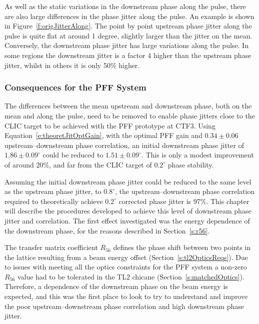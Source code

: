 As well as the static variations in the downstream phase along the pulse, there are also large differences in the phase jitter along the pulse. An example is shown in Figure~\ref{f:origJitterAlong}. The point by point upstream phase jitter along the pulse is quite flat at around 1 degree, slightly larger than the jitter on the mean. Conversely, the downstream phase jitter has large variations along the pulse. In some regions the downstream jitter is a factor 4 higher than the upstream phase jitter, whilst in others it is only 50\% higher.

\subsubsection{Consequences for the PFF System}

The differences between the mean upstream and downstream phase, both on the mean and along the pulse, need to be removed to enable phase jitters close to the CLIC target to be achieved with the PFF prototype at CTF3. Using Equation~\ref{e:theoretJitOptGain}, with the optimal PFF gain and \(0.34\pm0.06\) upstream--downstream phase correlation, an initial downstream phase jitter of \(1.86\pm0.09^\circ\) could be reduced to \(1.51\pm0.09^\circ\). This is only a modest improvement of around 20\%, and far from the CLIC target of \(0.2^\circ\) phase stability. %

Assuming the initial downstream phase jitter could be reduced to the same level as the upstream phase jitter, to \(0.8^\circ\), the upstream--downstream phase correlation required to theoretically achieve \(0.2^\circ\) corrected phase jitter is 97\%. This chapter will describe the procedures developed to achieve this level of downstream phase jitter and correlation. The first effect investigated was the energy dependence of the downstream phase, for the reasons described in Section~\ref{s:r56}.


The transfer matrix coefficient \(R_{56}\) defines the phase shift between two points in the lattice resulting from a beam energy offset (Section~\ref{s:tl2OpticsReqs}). Due to issues with meeting all the optics constraints for the PFF system a non-zero \(R_{56}\) value had to be tolerated in the TL2 chicane (Section~\ref{s:matchedOptics}).  Therefore, a dependence of the downstream phase on the beam energy is expected, and this was the first place to look to try to understand and improve the poor upstream--downstream phase correlation and high downstream phase jitter.

